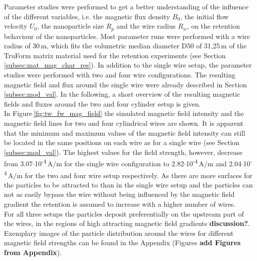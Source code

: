 Parameter studies were performed to get a better understanding of the influence of the different variables, i.e. the magnetic flux density $B_{0}$, the initial flow velocity $U_{0}$, the nanoparticle size $R_{p}$ and the wire radius $R_{w}$, on the retention behaviour of the nanoparticles.
Most parameter runs were performed with a wire radius of 30\,\textmu m, which fits the volumetric median diameter D50 of 31,25\,\textmu m of the TruForm matrix material used for the retention experiments (see Section\,\ref{subsec:mat_mag_char_res}). In addition to the single wire setup, the parameter studies were performed with two and four wire configurations. The resulting magnetic field and flux around the single wire were already described in Section\,\ref{subsec:mod_val}. In the following, a short overview of the resulting  magnetic fields and fluxes around the two and four cylinder setup is given.\\
In Figure\,\ref{fig:tw_fw_mag_field} the simulated magnetic field intensity and the magnetic field lines for two and four cylindrical wires are shown. It is apparent that the minimum and maximum values of the magnetic field intensity can still be located in the same positions on each wire as for a single wire (see Section\,\ref{subsec:mod_val}). The highest values for the field strength, however, decrease from 3.07$\cdotp$10\textsuperscript{-4}\,A/m for the single wire configuration to 2.82$\cdotp$10\textsuperscript{-4}\,A/m and 2.04$\cdotp$10\textsuperscript{-4}\,A/m for the two and four wire setup respectively. As there are more surfaces for the particles to be attracted to than in the single wire setup and the particles can not as easily bypass the wire without being influenced by the magnetic field gradient the retention is assumed to increase with a higher number of wires.\\
For all three setups the particles deposit preferentially on the upstream part of the wires, in the regions of high attracting magnetic field gradients \textbf{discussion?}. Exemplary images of the particle distribution around the wires for different magnetic field strengths can be found in the Appendix (Figures \textbf{add Figures from Appendix}). 

